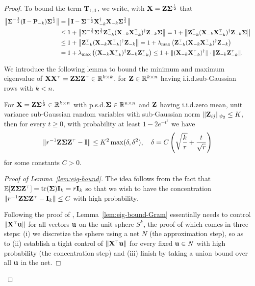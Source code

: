 \documentclass[11pt]{article}
\begin{document}
\begin{proof}
\medskip

To bound the term $\mathbf{T}_{1,1}$, we write, with $\mathbf X = \mathbf Z \mathbf{\Sigma}^{\frac12}$ that
\begin{align*}
 \big\|\Sigmab^{-\frac12}( \I -\P_{-k}) \Sigmab^{\frac12}\big\|
 &= \big\|\I -
   \Sigmab^{-\frac12}\X_{-k}^\dagger\X_{-k}\Sigmab^{\frac12}\big\|
 \\
 &\leq 1 +
   \big\|\Sigmab^{-\frac12}\Sigmab^{\frac12}\Z_{-k}^\top(\X_{-k}\X_{-k}^\top)^{\dagger}\Z_{-k}\Sigmab\big\| = 1 + \big\|\Z_{-k}^\top(\X_{-k}\X_{-k}^\top)^{\dagger}\Z_{-k}\Sigmab\big\| \\ 
 &\le 1 + \big\|\Z_{-k}^\top(\X_{-k}\X_{-k}^\top)^{\dagger}\Z_{-k}\big\| = 1 + \lambda_{\max} \left( \Z_{-k}^\top(\X_{-k}\X_{-k}^\top)^{\dagger}\Z_{-k} \right) \\ 
 &= 1 + \lambda_{\max} \left( (\X_{-k}\X_{-k}^\top)^{\dagger}\Z_{-k} \Z_{-k}^\top \right) \le 1 + \| (\X_{-k}\X_{-k}^\top)^\dagger \| \cdot \| \Z_{-k} \Z_{-k}^\top \|.
\end{align*}

We introduce the following lemma to bound the minimum and maximum eigenvalue of $\X \X^\top = \Z \Sigmab \Z^\top \in \R^{k \times k}$, for $\mathbf Z \in \mathbb R^{k \times n}$ having i.i.d.\@ sub-Gaussian rows with $k < n$.

\begin{lemma}\label{lem:eig-bound-Gram}\label{lem:eig-bound}
For $\mathbf X = \mathbf Z \mathbf{\Sigma}^{\frac12} \in \mathbb R^{k \times n}$ with p.s.d.\@ $\mathbf{\Sigma} \in \mathbb R^{n \times n}$ and $\mathbf Z$ having i.i.d.\@ zero mean, unit variance sub-Gaussian random variables with sub-Gaussian norm $\| \mathbf Z_{ij} \|_{\psi_2} \le K$, then for every $t \ge 0$, with probability at least $1 - 2 e^{-t^2}$ we have
\begin{equation}\label{eq:lem-eig-Gram}
  \| r^{-1} \Z \Sigmab \Z^\top - \I \| \le K^2 \max(\delta, \delta^2), \quad \delta = C \left( \sqrt{ \frac{k}{r} } + \frac{t}{\sqrt r} \right)
\end{equation}
for some constants $C > 0$. %
\end{lemma}

\begin{proof}[Proof of Lemma~\ref{lem:eig-bound}]
The idea follows from the fact that $\E[\Z \Sigmab \Z^\top] = \tr (\Sigmab) \I_k = r \I_k$ so that we wish to have the concentration $\| r^{-1} \Z \Sigmab \Z^\top - \I_k \| \le C$ with high probability.

Following the proof of \cite[Theorem~4.6.1]{vershynin2018high}, Lemma~\ref{lem:eig-bound-Gram} essentially needs to control $\| \X^\top \u \|$ for all vectors $\mathbf u $ on the unit sphere $S^{k}$, the proof of which  comes in three steps: (i) we discretize the sphere using a net $\mathit N$ (the approximation step), so as to (ii) establish a tight control of $\| \X^\top \u \|$ for every fixed $\mathbf u \in \mathit N$ with high probability (the concentration step) and (iii) finish by taking a union bound over all $\mathbf u$ in the net.


\end{proof}
\end{proof}
\end{document}
